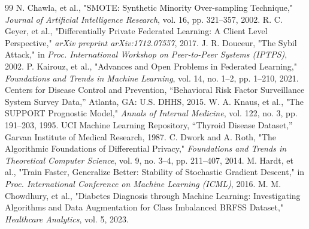 \documentclass[10pt, a4paper, twocolumn]{article}
\begin{document}
\begin{thebibliography}{99}
 N. Chawla, et al., "SMOTE: Synthetic Minority Over-sampling Technique," \textit{Journal of Artificial Intelligence Research}, vol. 16, pp. 321--357, 2002.
 R. C. Geyer, et al., "Differentially Private Federated Learning: A Client Level Perspective," \textit{arXiv preprint arXiv:1712.07557}, 2017.
 J. R. Douceur, "The Sybil Attack," in \textit{Proc. International Workshop on Peer-to-Peer Systems (IPTPS)}, 2002.
 P. Kairouz, et al., "Advances and Open Problems in Federated Learning," \textit{Foundations and Trends in Machine Learning}, vol. 14, no. 1--2, pp. 1--210, 2021.
 Centers for Disease Control and Prevention, ``Behavioral Risk Factor Surveillance System Survey Data,'' Atlanta, GA: U.S. DHHS, 2015.
 W. A. Knaus, et al., "The SUPPORT Prognostic Model," \textit{Annals of Internal Medicine}, vol. 122, no. 3, pp. 191--203, 1995.
 UCI Machine Learning Repository, ``Thyroid Disease Dataset,'' Garvan Institute of Medical Research, 1987.
 C. Dwork and A. Roth, "The Algorithmic Foundations of Differential Privacy," \textit{Foundations and Trends in Theoretical Computer Science}, vol. 9, no. 3--4, pp. 211--407, 2014.
 M. Hardt, et al., "Train Faster, Generalize Better: Stability of Stochastic Gradient Descent," in \textit{Proc. International Conference on Machine Learning (ICML)}, 2016.
 M. M. Chowdhury, et al., "Diabetes Diagnosis through Machine Learning: Investigating Algorithms and Data Augmentation for Class Imbalanced BRFSS Dataset," \textit{Healthcare Analytics}, vol. 5, 2023.
\end{thebibliography}
\end{document}
